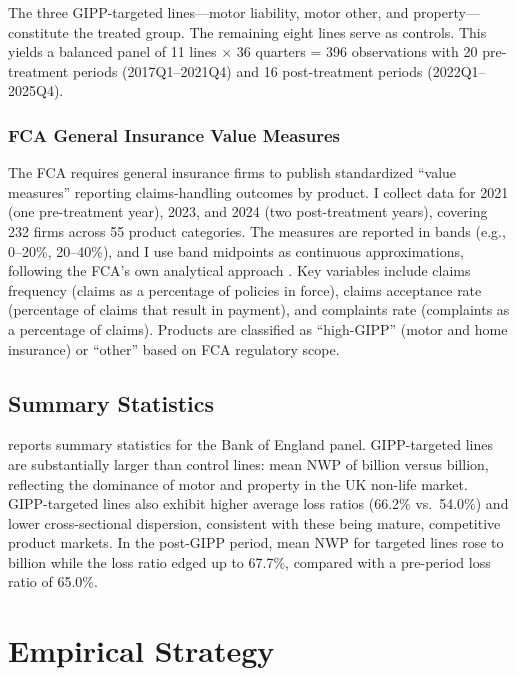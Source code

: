 \documentclass[12pt]{article}
\begin{document}
The three GIPP-targeted lines---motor liability, motor other, and property---constitute the treated group. The remaining eight lines serve as controls. This yields a balanced panel of 11 lines $\times$ 36 quarters = 396 observations with 20 pre-treatment periods (2017Q1--2021Q4) and 16 post-treatment periods (2022Q1--2025Q4).

\subsubsection*{FCA General Insurance Value Measures} The FCA requires general insurance firms to publish standardized ``value measures'' reporting claims-handling outcomes by product. I collect data for 2021 (one pre-treatment year), 2023, and 2024 (two post-treatment years), covering 232 firms across 55 product categories. The measures are reported in bands (e.g., 0--20\%, 20--40\%), and I use band midpoints as continuous approximations, following the FCA's own analytical approach \citep{FCA_EP25_2}. Key variables include claims frequency (claims as a percentage of policies in force), claims acceptance rate (percentage of claims that result in payment), and complaints rate (complaints as a percentage of claims). Products are classified as ``high-GIPP'' (motor and home insurance) or ``other'' based on FCA regulatory scope.

\subsection{Summary Statistics}

 reports summary statistics for the Bank of England panel. GIPP-targeted lines are substantially larger than control lines: mean NWP of  billion versus  billion, reflecting the dominance of motor and property in the UK non-life market. GIPP-targeted lines also exhibit higher average loss ratios (66.2\% vs.\ 54.0\%) and lower cross-sectional dispersion, consistent with these being mature, competitive product markets. In the post-GIPP period, mean NWP for targeted lines rose to  billion while the loss ratio edged up to 67.7\%, compared with a pre-period loss ratio of 65.0\%.




\section{Empirical Strategy}
\label{sec:strategy}
\end{document}
